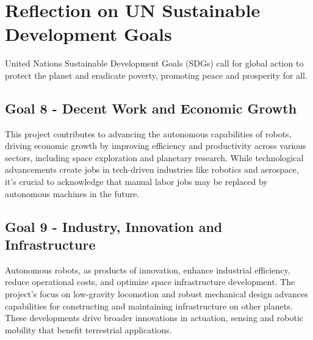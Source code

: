 \section{Reflection on UN Sustainable Development Goals}
United Nations Sustainable Development Goals (SDGs) call for global action to protect the planet and eradicate poverty, promoting peace and prosperity for all.

\subsection{Goal 8 - Decent Work and Economic Growth}
This project contributes to advancing the autonomous capabilities of robots, driving economic growth by improving efficiency and productivity across various sectors, including space exploration and planetary research. While technological advancements create jobs in tech-driven industries like robotics and aerospace, it's crucial to acknowledge that manual labor jobs may be replaced by autonomous machines in the future.

\subsection{Goal 9 - Industry, Innovation and Infrastructure} 
Autonomous robots, as products of innovation, enhance industrial efficiency, reduce operational costs, and optimize space infrastructure development. The project's focus on low-gravity locomotion and robust mechanical design advances capabilities for constructing and maintaining infrastructure on other planets. These developments drive broader innovations in actuation, sensing and robotic mobility that benefit terrestrial applications.



